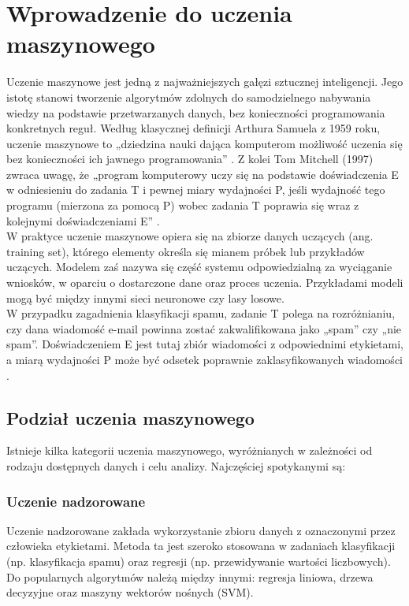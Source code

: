 \documentclass[a4paper, 12pt]{article}
\numberwithin{equation}{section}
\begin{document}
    \section{Wprowadzenie do uczenia maszynowego}
    Uczenie maszynowe jest jedną z najważniejszych gałęzi sztucznej inteligencji.
    Jego istotę stanowi tworzenie algorytmów zdolnych do samodzielnego nabywania wiedzy na podstawie przetwarzanych danych, bez konieczności programowania konkretnych reguł. 
    Według klasycznej definicji Arthura Samuela z 1959 roku, uczenie maszynowe to „dziedzina nauki dająca komputerom możliwość uczenia się bez konieczności ich jawnego programowania” \cite{samuel1959checkers}.
    Z kolei Tom Mitchell (1997) zwraca uwagę, że „program komputerowy uczy się na podstawie doświadczenia E w odniesieniu do zadania T i pewnej miary wydajności P, jeśli wydajność tego programu (mierzona za pomocą P) wobec zadania T poprawia się wraz z kolejnymi doświadczeniami E” \cite{mitchell1997machinelearning}.
    \\ 
    \indent W praktyce uczenie maszynowe opiera się na zbiorze danych uczących (ang. training set), którego elementy określa się mianem próbek lub przykładów uczących. 
    Modelem zaś nazywa się część systemu odpowiedzialną za wyciąganie wniosków, w oparciu o dostarczone dane oraz proces uczenia. 
    Przykładami modeli mogą być między innymi sieci neuronowe czy lasy losowe.
    \\
    \indent W przypadku zagadnienia klasyfikacji spamu, zadanie T polega na rozróżnianiu, czy dana wiadomość e-mail powinna zostać zakwalifikowana jako „spam” czy „nie spam”. 
    Doświadczeniem E jest tutaj zbiór wiadomości z odpowiednimi etykietami, a miarą wydajności P może być odsetek poprawnie zaklasyfikowanych wiadomości \cite{HandsOnMachineLearning}.
    
    \subsection{Podział uczenia maszynowego}
    Istnieje kilka kategorii uczenia maszynowego, wyróżnianych w zależności od rodzaju dostępnych danych i celu analizy. Najczęściej spotykanymi są:
    
    \subsubsection{Uczenie nadzorowane}
    Uczenie nadzorowane zakłada wykorzystanie zbioru danych z oznaczonymi przez człowieka etykietami. Metoda ta jest szeroko stosowana w zadaniach klasyfikacji (np. klasyfikacja spamu) oraz regresji (np. przewidywanie wartości liczbowych). Do popularnych algorytmów należą między innymi: regresja liniowa, drzewa decyzyjne oraz maszyny wektorów nośnych (SVM).
\end{document}
